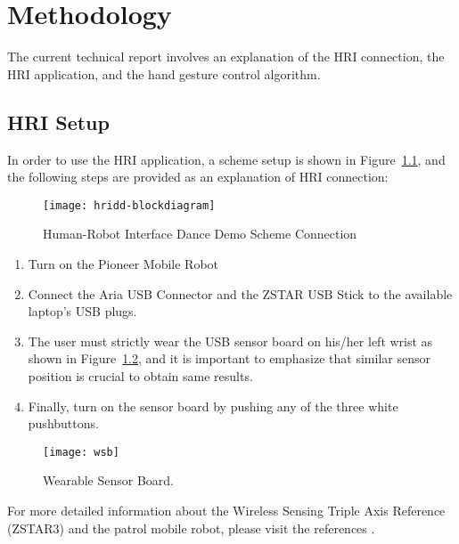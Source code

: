 
\chapter{Methodology}

The current technical report involves an explanation of the HRI connection,
the HRI application, and the hand gesture control algorithm.

\section{HRI Setup}

In order to use the HRI application, a scheme setup is shown in  Figure~\ref{fig:hbd}, and the
following steps are provided as an explanation of HRI connection:
\begin{figure}[h!]
  \begin{center}
  \texttt{[image: hridd-blockdiagram]}
    \caption[HRI]{Human-Robot Interface Dance Demo Scheme Connection}
    \label{fig:hbd}
  \end{center}
\end{figure}


\begin{enumerate}
 \item Turn on the Pioneer Mobile Robot
 \item Connect the Aria USB Connector and the ZSTAR USB Stick to the available laptop's USB plugs.
 \item The user must strictly wear  the USB sensor board on his/her left wrist  as shown in Figure~\ref{fig:wsb}, 
 and it is important to emphasize that similar sensor position is crucial to obtain same results.
 \item Finally, turn on the sensor board by pushing any of the three white pushbuttons.
\end{enumerate}


\begin{figure}[h!]
  \begin{center}
  \texttt{[image: wsb]}
    \caption[HRI]{Wearable Sensor Board.}
    \label{fig:wsb}
  \end{center}
\end{figure}



For more detailed information about the Wireless Sensing Triple Axis Reference (ZSTAR3) 
and the patrol mobile robot, please visit the references \cite{zstar, probot}.



